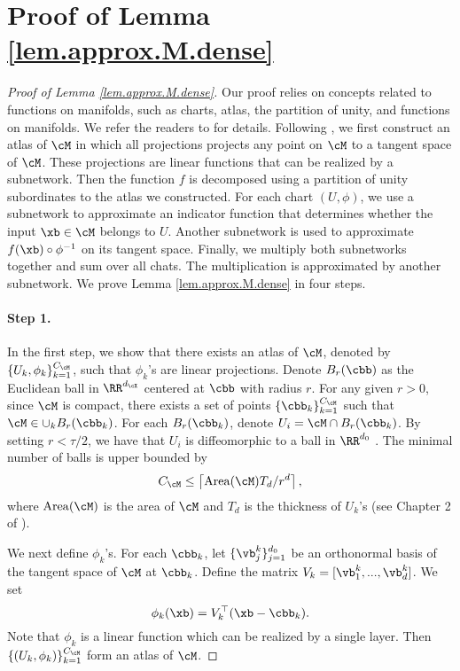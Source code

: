 \documentclass[11pt]{article} %
\begin{document}
\section{Proof of Lemma \ref{lem.approx.M.dense}}\label{lem.approx.M.dense.proof}
\begin{proof}[Proof of Lemma \ref{lem.approx.M.dense}]
	Our proof relies on concepts related to functions on manifolds, such as charts, atlas, the partition of unity, and functions on manifolds. We refer the readers to \citep{loring2011introduction,lee2006riemannian,chen2019nonparametric,hao2021icml} for details. Following \citep[Proof of Theorem 1]{chen1995universal}, we first construct an atlas of $\cM$ in which all projections projects any point on $\cM$ to a tangent space of $\cM$. These projections are linear functions that can be realized by a subnetwork. Then the function $f$ is decomposed using a partition of unity subordinates to the atlas we constructed. For each chart $(U,\phi)$, we use a subnetwork to approximate an indicator function that determines whether the input $\xb\in\cM$ belongs to $U$. Another subnetwork is used to approximate $f(\xb)\circ \phi^{-1}$ on its tangent space.  Finally, we multiply both subnetworks together and sum over all chats. The multiplication is approximated by another subnetwork.
	We prove Lemma \ref{lem.approx.M.dense} in four steps. 
	\paragraph{Step 1.} In the first step, we show that there exists an atlas of $\cM$, denoted by $\{U_k,\phi_k\}_{k=1}^{C_{\cM}}$, such that $\phi_k$'s are linear projections. Denote $B_r(\cbb)$ as the Euclidean ball in $\RR^{d_{\cX}}$ centered at $\cbb$ with radius $r$. For any given $r>0$, since $\cM$ is compact, there exists a set of points $\{\cbb_k\}_{k=1}^{ C_{\cM}}$ such that $\cM\in \cup_{k} B_r(\cbb_k)$. 	
	For each $B_r(\cbb_k)$, denote $U_i=\cM\cap B_r(\cbb_k)$. By setting $r<\tau/2$, we have that $U_i$ is diffeomorphic to a ball in $\RR^{d_0}$ \citep{niyogi2008finding}. The minimal number of balls is upper bounded by 
	$$
	C_{\cM}\leq \left\lceil {\rm Area}(\cM)T_d/r^d\right\rceil,
	$$
	where ${\rm Area}(\cM)$ is the area of $\cM$ and $T_d$ is the thickness of $U_k$'s (see Chapter 2 of \citep{conway2013sphere}).
	
	We next define $\phi_k$'s. For each $\cbb_k$, let $\{\vb^k_j\}_{j=1}^{d_0}$ be an orthonormal basis of the tangent space of $\cM$ at $\cbb_k$. Define the matrix $V_k=[\vb^k_1,..., \vb^k_d]$. We set 
	$$
	\phi_k(\xb) = V_k^{\top}(\xb-\cbb_k).
	$$ 
	Note that $\phi_k$ is a linear function which can be realized by a single layer. Then $\{(U_k,\phi_k)\}_{k=1}^{C_{\cM}}$ form an atlas of $\cM$.
	

\end{proof}
\end{document}
